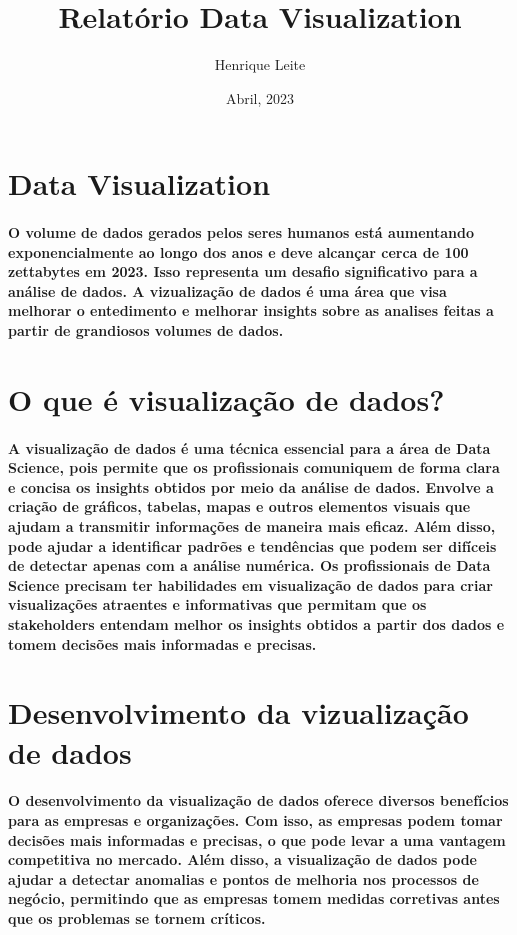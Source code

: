 \documentclass{article}
\title{Relatório Data Visualization}
\author{Henrique Leite}
\date{Abril, 2023}
\begin{document}
\maketitle

\section{Data Visualization}
\paragraph{O volume de dados gerados pelos seres humanos está aumentando
exponencialmente ao longo dos anos e deve alcançar cerca de 100 zettabytes em
2023. Isso representa um desafio significativo para a análise de dados. A
vizualização de dados é uma área que visa melhorar o entedimento e melhorar
insights sobre as analises feitas a partir de grandiosos volumes de dados.}

\section{O que é visualização de dados?}
\paragraph{A visualização de dados é uma técnica essencial para a área de Data Science, pois
permite que os profissionais comuniquem de forma clara e concisa os insights
obtidos por meio da análise de dados. Envolve a criação de gráficos, tabelas, mapas
e outros elementos visuais que ajudam a transmitir informações de maneira mais
eficaz. Além disso, pode ajudar a identificar padrões e tendências que podem ser
difíceis de detectar apenas com a análise numérica. Os profissionais de Data
Science precisam ter habilidades em visualização de dados para criar visualizações
atraentes e informativas que permitam que os stakeholders entendam melhor os
insights obtidos a partir dos dados e tomem decisões mais informadas e precisas.}

\section{Desenvolvimento da vizualização de dados}
\paragraph{O desenvolvimento da visualização de dados oferece diversos benefícios para as
empresas e organizações. Com isso, as empresas podem tomar decisões mais
informadas e precisas, o que pode levar a uma vantagem competitiva no mercado.
Além disso, a visualização de dados pode ajudar a detectar anomalias e pontos de
melhoria nos processos de negócio, permitindo que as empresas tomem medidas
corretivas antes que os problemas se tornem críticos.}
\end{document}
